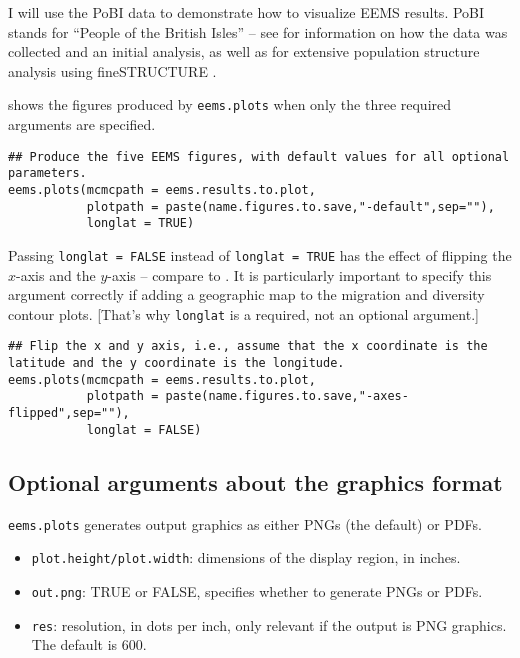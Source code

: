 \documentclass[a4paper,10pt,DIV=15,titlepage,mpinclude=true]{scrartcl}
\newcommand{\keystring}[1]{{\tt #1}}
\begin{document}
I will use the PoBI data to demonstrate how to visualize EEMS results. PoBI stands for ``People of the British Isles'' -- see \cite{Winney:2012aa} for information on how the data was collected and an initial analysis, as well as \cite{Leslie:2015aa} for extensive population structure analysis using fineSTRUCTURE \cite{Lawson:2012fk}.

 shows the figures produced by \keystring{eems.plots} when only the three required arguments are specified.

\begin{lstlisting}[style=Rcode]
## Produce the five EEMS figures, with default values for all optional parameters. 
eems.plots(mcmcpath = eems.results.to.plot,
           plotpath = paste(name.figures.to.save,"-default",sep=""),
           longlat = TRUE)
\end{lstlisting}

Passing \keystring{longlat = FALSE} instead of \keystring{longlat = TRUE} has the effect of flipping the $x$-axis and the $y$-axis -- compare  to . It is particularly important to specify this argument correctly if adding a geographic map to the migration and diversity contour plots. [That's why \keystring{longlat} is a required, not an optional argument.]

\begin{lstlisting}[style=Rcode]
## Flip the x and y axis, i.e., assume that the x coordinate is the latitude and the y coordinate is the longitude.
eems.plots(mcmcpath = eems.results.to.plot,
           plotpath = paste(name.figures.to.save,"-axes-flipped",sep=""),
           longlat = FALSE)
\end{lstlisting}

\subsection{Optional arguments about the graphics format}

\keystring{eems.plots} generates output graphics as either PNGs (the default) or PDFs.

\begin{itemize}
  \item \keystring{plot.height/plot.width}: dimensions of the display region, in inches.
  \item \keystring{out.png}: TRUE or FALSE, specifies whether to generate PNGs or PDFs.
  \item \keystring{res}: resolution, in dots per inch, only relevant if the output is PNG graphics. The default is 600.
\end{itemize}
\end{document}
